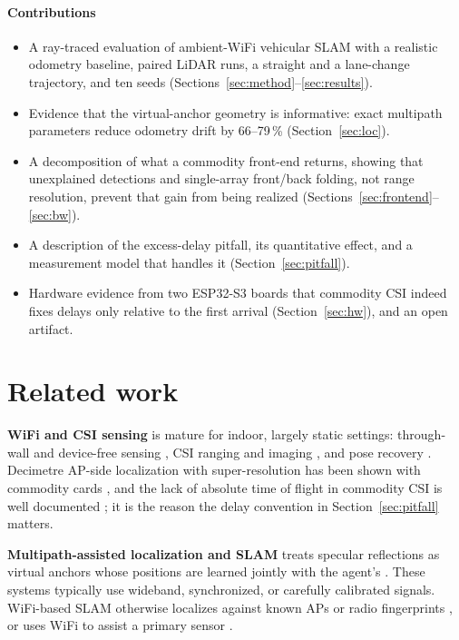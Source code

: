 \documentclass[preprint,12pt]{elsarticle}
\begin{document}
\paragraph{Contributions}
\begin{itemize}
  \item A ray-traced evaluation of ambient-WiFi vehicular SLAM with a realistic odometry
        baseline, paired LiDAR runs, a straight and a lane-change trajectory, and ten seeds
        (Sections~\ref{sec:method}--\ref{sec:results}).
  \item Evidence that the virtual-anchor geometry is informative: exact multipath parameters
        reduce odometry drift by 66--79\,\% (Section~\ref{sec:loc}).
  \item A decomposition of what a commodity front-end returns, showing that unexplained
        detections and single-array front/back folding, not range resolution, prevent that
        gain from being realized (Sections~\ref{sec:frontend}--\ref{sec:bw}).
  \item A description of the excess-delay pitfall, its quantitative effect, and a measurement
        model that handles it (Section~\ref{sec:pitfall}).
  \item Hardware evidence from two ESP32-S3 boards that commodity CSI indeed fixes delays only
        relative to the first arrival (Section~\ref{sec:hw}), and an open artifact.
\end{itemize}

\section{Related work}\label{sec:related}

\textbf{WiFi and CSI sensing} is mature for indoor, largely static settings: through-wall and
device-free sensing \cite{chetty2012ttwifi,zhao2018rfpose,zhao2018rfpose3d}, CSI ranging and
imaging \cite{li2021standalone,wang2025csipower,maatta2024csipointcloud}, and pose recovery
\cite{geng2022denseposewifi,yan2024personinwifi3d}. Decimetre AP-side localization with
super-resolution has been shown with commodity cards \cite{kotaru2015spotfi}, and the lack of
absolute time of flight in commodity CSI is well documented \cite{xie2015pdp}; it is the reason
the delay convention in Section~\ref{sec:pitfall} matters.

\textbf{Multipath-assisted localization and SLAM} treats specular reflections as virtual
anchors whose positions are learned jointly with the agent's
\cite{leitinger2015jsac,gentner2016channelslam,ulmschneider2017multipath,leitinger2024mpslamcoop,li2024bpmpslam}.
These systems typically use wideband, synchronized, or carefully calibrated signals. WiFi-based
SLAM otherwise localizes against known APs or radio fingerprints
\cite{arun2022p2slam,liu2023radiofingerprintslam}, or uses WiFi to assist a primary sensor
\cite{arun2022viwid,ismail2022wifilidarslam,li2025ekfwifilidarimu}.
\end{document}
